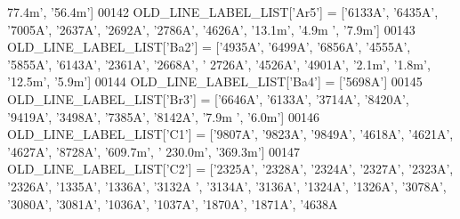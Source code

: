\begin{DoxyCode}
{{{      77.4m'}, \textcolor{stringliteral}{'56.4m'}]
00142 OLD\_LINE\_LABEL\_LIST[\textcolor{stringliteral}{'Ar5'}] = [\textcolor{stringliteral}{'6133A'}, \textcolor{stringliteral}{'6435A'}, \textcolor{stringliteral}{'7005A'}, \textcolor{stringliteral}{'2637A'}, \textcolor{stringliteral}{'2692A'}, \textcolor{stringliteral}{'2786A'}, \textcolor{stringliteral}{'4626A'}, \textcolor{stringliteral}{'13.1m'}, \textcolor{stringliteral}{'4.9m
      '}, \textcolor{stringliteral}{'7.9m'}]
00143 OLD\_LINE\_LABEL\_LIST[\textcolor{stringliteral}{'Ba2'}] = [\textcolor{stringliteral}{'4935A'}, \textcolor{stringliteral}{'6499A'}, \textcolor{stringliteral}{'6856A'}, \textcolor{stringliteral}{'4555A'}, \textcolor{stringliteral}{'5855A'}, \textcolor{stringliteral}{'6143A'}, \textcolor{stringliteral}{'2361A'}, \textcolor{stringliteral}{'2668A'}, \textcolor{stringliteral}{'
      2726A'}, \textcolor{stringliteral}{'4526A'}, \textcolor{stringliteral}{'4901A'}, \textcolor{stringliteral}{'2.1m'}, \textcolor{stringliteral}{'1.8m'}, \textcolor{stringliteral}{'12.5m'}, \textcolor{stringliteral}{'5.9m'}]
00144 OLD\_LINE\_LABEL\_LIST[\textcolor{stringliteral}{'Ba4'}] = [\textcolor{stringliteral}{'5698A'}]
00145 OLD\_LINE\_LABEL\_LIST[\textcolor{stringliteral}{'Br3'}] = [\textcolor{stringliteral}{'6646A'}, \textcolor{stringliteral}{'6133A'}, \textcolor{stringliteral}{'3714A'}, \textcolor{stringliteral}{'8420A'}, \textcolor{stringliteral}{'9419A'}, \textcolor{stringliteral}{'3498A'}, \textcolor{stringliteral}{'7385A'}, \textcolor{stringliteral}{'8142A'}, \textcolor{stringliteral}{'7.9m
      '}, \textcolor{stringliteral}{'6.0m'}]
00146 OLD\_LINE\_LABEL\_LIST[\textcolor{stringliteral}{'C1'}] = [\textcolor{stringliteral}{'9807A'}, \textcolor{stringliteral}{'9823A'}, \textcolor{stringliteral}{'9849A'}, \textcolor{stringliteral}{'4618A'}, \textcolor{stringliteral}{'4621A'}, \textcolor{stringliteral}{'4627A'}, \textcolor{stringliteral}{'8728A'}, \textcolor{stringliteral}{'609.7m'}, \textcolor{stringliteral}{'
      230.0m'}, \textcolor{stringliteral}{'369.3m'}]
00147 OLD\_LINE\_LABEL\_LIST[\textcolor{stringliteral}{'C2'}] = [\textcolor{stringliteral}{'2325A'}, \textcolor{stringliteral}{'2328A'}, \textcolor{stringliteral}{'2324A'}, \textcolor{stringliteral}{'2327A'}, \textcolor{stringliteral}{'2323A'}, \textcolor{stringliteral}{'2326A'}, \textcolor{stringliteral}{'1335A'}, \textcolor{stringliteral}{'1336A'}, \textcolor{stringliteral}{'3132A
      '}, \textcolor{stringliteral}{'3134A'}, \textcolor{stringliteral}{'3136A'}, \textcolor{stringliteral}{'1324A'}, \textcolor{stringliteral}{'1326A'}, \textcolor{stringliteral}{'3078A'}, \textcolor{stringliteral}{'3080A'}, \textcolor{stringliteral}{'3081A'}, \textcolor{stringliteral}{'1036A'}, \textcolor{stringliteral}{'1037A'}, \textcolor{stringliteral}{'1870A'}, \textcolor{stringliteral}{'1871A'}, \textcolor{stringliteral}{'4638A
}}}
\end{DoxyCode}
